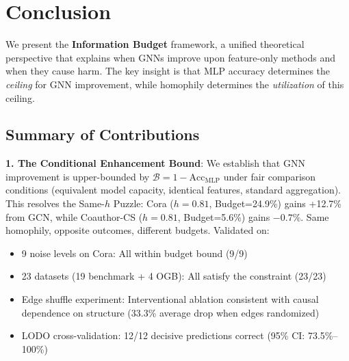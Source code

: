 
\section{Conclusion}
\label{sec:conclusion}

We present the \textbf{Information Budget} framework, a unified theoretical perspective that explains when GNNs improve upon feature-only methods and when they cause harm. The key insight is that MLP accuracy determines the \textit{ceiling} for GNN improvement, while homophily determines the \textit{utilization} of this ceiling.

\subsection{Summary of Contributions}

\textbf{1. The Conditional Enhancement Bound}: We establish that GNN improvement is upper-bounded by $\mathcal{B} = 1 - \text{Acc}_{\text{MLP}}$ under fair comparison conditions (equivalent model capacity, identical features, standard aggregation). This resolves the Same-$h$ Puzzle: Cora ($h=0.81$, Budget=24.9\%) gains +12.7\% from GCN, while Coauthor-CS ($h=0.81$, Budget=5.6\%) gains $-0.7\%$. Same homophily, opposite outcomes, different budgets. Validated on:
\begin{itemize}
    \item 9 noise levels on Cora: All within budget bound (9/9)
    \item 23 datasets (19 benchmark + 4 OGB): All satisfy the constraint (23/23)
    \item Edge shuffle experiment: Interventional ablation consistent with causal dependence on structure (33.3\% average drop when edges randomized)
    \item LODO cross-validation: 12/12 decisive predictions correct (95\% CI: 73.5\%--100\%)
\end{itemize}

